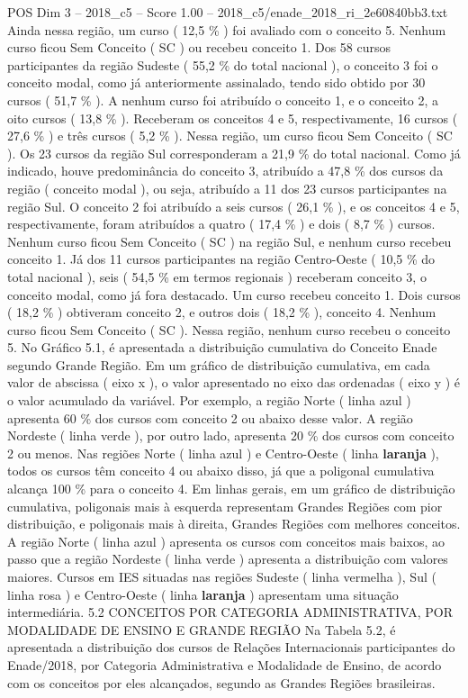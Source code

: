 \begin{textsample}{POS Dim 3 – 2018\_c5 – Score 1.00 – 2018\_c5/enade\_2018\_ri\_2e60840bb3.txt}
Ainda nessa região, um curso ( 12,5 \% ) foi avaliado com o conceito 5.
Nenhum curso ficou Sem Conceito ( SC ) ou recebeu conceito 1.
Dos 58 cursos participantes da região Sudeste ( 55,2 \% do total nacional ), o conceito 3 foi o conceito modal, como já anteriormente assinalado, tendo sido obtido por 30 cursos ( 51,7 \% ).
A nenhum curso foi atribuído o conceito 1, e o conceito 2, a oito cursos ( 13,8 \% ).
Receberam os conceitos 4 e 5, respectivamente, 16 cursos ( 27,6 \% ) e três cursos ( 5,2 \% ).
Nessa região, um curso ficou Sem Conceito ( SC ).
Os 23 cursos da região Sul corresponderam a 21,9 \% do total nacional.
Como já indicado, houve predominância do conceito 3, atribuído a 47,8 \% dos cursos da região ( conceito modal ), ou seja, atribuído a 11 dos 23 cursos participantes na região Sul.
O conceito 2 foi atribuído a seis cursos ( 26,1 \% ), e os conceitos 4 e 5, respectivamente, foram atribuídos a quatro ( 17,4 \% ) e dois ( 8,7 \% ) cursos.
Nenhum curso ficou Sem Conceito ( SC ) na região Sul, e nenhum curso recebeu conceito 1.
Já dos 11 cursos participantes na região Centro-Oeste ( 10,5 \% do total nacional ), seis ( 54,5 \% em termos regionais ) receberam conceito 3, o conceito modal, como já fora destacado.
Um curso recebeu conceito 1.
Dois cursos ( 18,2 \% ) obtiveram conceito 2, e outros dois ( 18,2 \% ), conceito 4.
Nenhum curso ficou Sem Conceito ( SC ).
Nessa região, nenhum curso recebeu o conceito 5.
No Gráfico 5.1, é apresentada a distribuição cumulativa do Conceito Enade segundo Grande Região.
Em um gráfico de distribuição cumulativa, em cada valor de abscissa ( eixo x ), o valor apresentado no eixo das ordenadas ( eixo y ) é o valor acumulado da variável.
Por exemplo, a região Norte ( linha azul ) apresenta 60 \% dos cursos com conceito 2 ou abaixo desse valor.
A região Nordeste ( linha verde ), por outro lado, apresenta 20 \% dos cursos com conceito 2 ou menos.
Nas regiões Norte ( linha azul ) e Centro-Oeste ( linha \textbf{laranja} ), todos os cursos têm conceito 4 ou abaixo disso, já que a poligonal cumulativa alcança 100 \% para o conceito 4.
Em linhas gerais, em um gráfico de distribuição cumulativa, poligonais mais à esquerda representam Grandes Regiões com pior distribuição, e poligonais mais à direita, Grandes Regiões com melhores conceitos.
A região Norte ( linha azul ) apresenta os cursos com conceitos mais baixos, ao passo que a região Nordeste ( linha verde ) apresenta a distribuição com valores maiores.
Cursos em IES situadas nas regiões Sudeste ( linha vermelha ), Sul ( linha rosa ) e Centro-Oeste ( linha \textbf{laranja} ) apresentam uma situação intermediária. 5.2 CONCEITOS POR CATEGORIA ADMINISTRATIVA, POR MODALIDADE DE ENSINO E GRANDE REGIÃO Na Tabela 5.2, é apresentada a distribuição dos cursos de Relações Internacionais participantes do Enade/2018, por Categoria Administrativa e Modalidade de Ensino, de acordo com os conceitos por eles alcançados, segundo as Grandes Regiões brasileiras.

\end{textsample}
